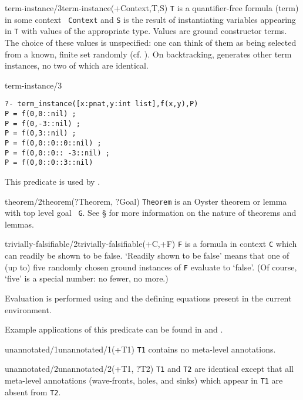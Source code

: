 \begin{predicate}{term-instance/3}{term-instance(+Context,T,S)}%
{\tt T} is a quantifier-free formula (term) in some context {\tt
Context} and {\tt S} is the result of instantiating variables
appearing in {\tt T} with values of the appropriate type.  Values are
ground constructor terms.  The choice of these values is unspecified:
one can think of them as being selected from a known, finite  set
randomly (cf. ).   On backtracking,
generates other term instances, no two of which are identical.


\begin{example}{term-instance/3}
\begin{verbatim}
?- term_instance([x:pnat,y:int list],f(x,y),P)
P = f(0,0::nil) ;
P = f(0,-3::nil) ;
P = f(0,3::nil) ;
P = f(0,0::0::0::nil) ;
P = f(0,0::0:: -3::nil) ;
P = f(0,0::0::3::nil) 
\end{verbatim}
This predicate is used by .
\end{example}
\end{predicate}

\begin{predicate}{theorem/2}{theorem(?Theorem, ?Goal)}%
{\tt Theorem} is an Oyster theorem or lemma with top level goal {\tt
G}.  See \S{} for more information on the
nature of theorems and lemmas.
\end{predicate}

\begin{predicate}{trivially-falsifiable/2}{trivially-falsifiable(+C,+F)}%
{\tt F} is a formula in context {\tt C} which can readily be shown to
be false.  `Readily shown to be false' means that one of (up to) five
randomly chosen ground instances of {\tt F} evaluate to `false'.
(Of course, `five' is a special number: no fewer, no more.)

Evaluation is performed using  and the defining
equations present in the current
environment.

Example applications of this predicate can be found in
 and .
\end{predicate}


\begin{predicate}{unannotated/1}{unannotated/1(+T1)}%
{\tt T1} contains no meta-level annotations.
\end{predicate}

\begin{predicate}{unannotated/2}{unannotated/2(+T1, ?T2)}%
{\tt T1} and {\tt T2} are identical except that all meta-level
annotations (wave-fronts, holes, and sinks) which appear in {\tt T1}
are absent from {\tt T2}.
\end{predicate}


